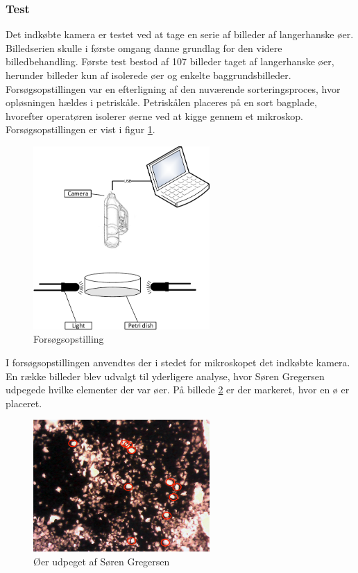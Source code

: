 \subsubsection{Test}
Det indkøbte kamera er testet ved at tage en serie af billeder af langerhanske øer. Billedserien skulle i første omgang danne grundlag for den videre billedbehandling. Første test bestod af 107 billeder taget af langerhanske øer, herunder billeder kun af isolerede øer og enkelte baggrundsbilleder. Forsøgsopstillingen var en efterligning af den nuværende sorteringsproces, hvor opløsningen hældes i petriskåle. Petriskålen placeres på en sort bagplade, hvorefter operatøren isolerer øerne ved at kigge gennem et mikroskop. Forsøgsopstillingen er vist i figur \ref{fig:kameraopstillingen}. 
\begin{figure}[H]
	\centering
	\includegraphics[width=0.6\textwidth]{billeder/software/kameraopstil-crop.pdf}
	\caption{Forsøgsopstilling}
	\label{fig:kameraopstillingen}
\end{figure}
I forsøgsopstillingen anvendtes der i stedet for mikroskopet det indkøbte kamera. En række billeder blev udvalgt til yderligere analyse, hvor Søren Gregersen udpegede hvilke elementer der var øer. På billede \ref{fig:isletSG} er der markeret, hvor en ø er placeret.

\begin{figure}[H]
	\centering
	\includegraphics[width=0.6\textwidth]{billeder/software/sgbillede.png}
	\caption{Øer udpeget af Søren Gregersen}
	\label{fig:isletSG}
\end{figure}

